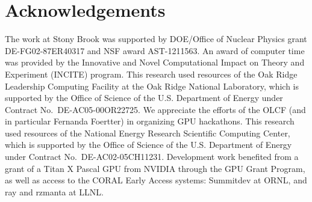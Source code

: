 \documentclass[numberedappendix]{aastex6}
\begin{document}

\cite{castro}

\section{Acknowledgements}

The work at Stony Brook was supported by DOE/Office of Nuclear
Physics grant DE-FG02-87ER40317 and NSF award AST-1211563.  An award
of computer time was provided by the Innovative and Novel
Computational Impact on Theory and Experiment (INCITE) program.  This
research used resources of the Oak Ridge Leadership Computing Facility
at the Oak Ridge National Laboratory, which is supported by the Office
of Science of the U.S. Department of Energy under Contract
No.\ DE-AC05-00OR22725.  We appreciate the efforts of the OLCF (and in
particular Fernanda Foertter) in organizing GPU hackathons.  This
research used resources of the National Energy Research Scientific
Computing Center, which is supported by the Office of Science of the
U.S. Department of Energy under Contract No.\ DE-AC02-05CH11231.
Development work benefited from a grant of a Titan X Pascal GPU
from NVIDIA through the GPU Grant Program, as well as access to
the CORAL Early Access systems: Summitdev at ORNL, and ray and rzmanta
at LLNL.



\end{document}
